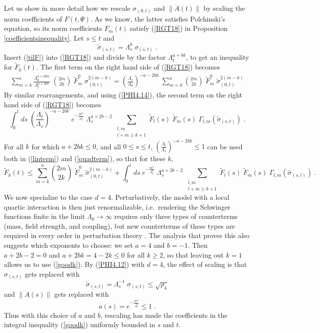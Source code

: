 \documentclass[12pt,twoside]{amsart}
\newcommand{\beq}{\begin{equation}}
\newcommand{\eeq}{\end{equation}}
\numberwithin{equation}{section}
\begin{document}
Let us show in more detail how we rescale $\sigma_{(0,t)}$ and $\|\dot{A}(t)\|$ by scaling the norm coefficients of $F(t,\Psi)$. As we know, the latter satisfies Polchinski's equation, so its norm coefficients $F_{m}(t)$ satisfy (\ref{RGT18}) in Proposition \ref{coefficientsinequality}. Let $s \le t$ and 
\beq
\tilde\sigma_{(s,t)}  = \Lambda_s^b \; \sigma_{(s,t)} \; .
\eeq
Insert (\ref{tilF}) into (\ref{RGT18}) and divide by the factor $\Lambda_t^{a+bk}$, to get an inequality for $\tilde F_k (t)$. The first term on the right hand side of (\ref{RGT18}) becomes
\begin{eqnarray}\label{linterm}
\sum_{m=k}^{n}\frac{\Lambda_{0}^{a+2bm}}{\Lambda_{t}^{a+2bk}} \; \binom{2m}{2k}\; \tilde F_{m}^{0}\; \sigma_{(0,t)}^{2(m-k)} 
=
\left(\frac{\Lambda_t}{\Lambda_0}\right)^{-a -2bk} \;
\sum_{m=k}^n 
\binom{2m}{2k}\;
\tilde F_m^0\;
\tilde\sigma_{(0,t)} ^{2 (m-k)}
\end{eqnarray}
By similar rearrangements, and using (\ref{PHI4.14}), the second term on the right hand side of (\ref{RGT18}) becomes
\beq\label{quadterm}
\int_0^t ds\; 
\left(
\frac{\Lambda_t}{\Lambda_s}
\right)^{-a-2bk} \;
e^{-\frac{m^2}{\Lambda_s^2}} \;
\Lambda_s^{a + 2b -2} \; 
\sum_{\substack{l,m \\ l+m \ge k+1}} \tilde F_{l}(s)\; \tilde F_{m}(s)\;
\Gamma_{l,m}(\tilde\sigma_{(s,t)}) \; .
\eeq
For all $k$ for which $a+2bk \le 0$, and all $0 \le s \le t$, $(\frac{\Lambda_t}{\Lambda_s})^{-a-2bk} \le 1$ can be used both in (\ref{linterm}) and (\ref{quadterm}), so that for these $k$,
\beq\label{goodk}
\tilde F_k (t) 
\le
\sum_{m=k}^n 
\binom{2m}{2k}\;
\tilde F_m^0\;
\tilde\sigma_{(0,t)} ^{2 (m-k)}
+
\int_0^t ds\; 
e^{-\frac{m^2}{\Lambda_s^2}} \;
\Lambda_s^{a + 2b -2} \; 
\sum_{\substack{l,m \\ l+m \ge k+1}} \tilde F_{l}(s)\; \tilde F_{m}(s)\;
\Gamma_{l,m}(\tilde\sigma_{(s,t)}) \; .
\eeq
We now specialize to the case $d=4$. Perturbatively, the model with a local quartic interaction is then just renormalizable, i.e.\ rendering the Schwinger functions finite in the limit $\Lambda_0 \to \infty$ requires only three types of counterterms (mass, field strength, and coupling), but new counterterms of these types are required in every order in perturbation theory \cite{KKS,MSbook}. The analysis that proves this also suggests which exponents to choose: we set $a = 4$ and $b=-1$. Then $a+2b-2=0$ and $a+2bk = 4-2k \le 0$ for all $k \ge 2$, so that leaving out $k=1$ allows us to use (\ref{goodk}). By (\ref{PHI4.12}) with $d=4$, the effect of scaling is that $\sigma_{(s,t)}$ gets replaced with 
\beq
\tilde\sigma_{(s,t)} = \Lambda_s^{-1}\; \sigma_{(s,t)} \le \sqrt{\rho_4}
\eeq
and $\|\dot A (s) \|$ gets replaced with
\beq
a(s) = e^{-\frac{m^2}{\Lambda_s^2}} \le 1\; .
\eeq
Thus with this choice of $a$ and $b$, rescaling has made the coefficients in the integral inequality (\ref{goodk}) uniformly bounded in $s$ and $t$. 
\end{document}
